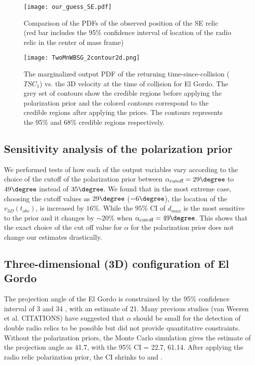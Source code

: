 \begin{figure}
	\texttt{[image: our\_guess\_SE.pdf]}
	\caption{Comparison of the PDFs of the observed position of the SE relic (red bar
	includes the 95\% confidence interval of location of the radio relic in
the center of mass frame)}
\end{figure}
\begin{figure}
	\texttt{[image: TwoMnWBSG\_2contour2d.png]}
	\caption{The marginalized output PDF of the returning time-since-collision
($TSC_1$) vs. the 3D velocity at the time of collision for El Gordo. The
grey set of contours show the credible regions before applying the
polarization prior and the colored contours correspond to the credible
regions after applying the priors. The contours represents the 95\% and
68\% credible regions respectively. }
	\label{fig:TSC_v3D}
\end{figure}

\subsection{Sensitivity analysis of the polarization prior}
%
\label{sec:sensitivityTests}
We performed tests of how each of the output variables vary according to the
choice of the cutoff of the polarization prior between
$\alpha_{\text{cutoff}} =
29 \degree$ to $49\degree$ instead of $35 \degree$.  
We found that in the most extreme case, choosing the cutoff values as $29
\degree$ ($-6 \degree$), the location of the $v_{3D}(t_{obs})$, is
increased by $ 16 \%$. While the $95\%$ CI of $d_{max}$ is
the most sensitive to the prior and it changes by
$\sim20 \%$ when $\alpha_{\text{cutoff}} = 49 \degree$. 
This shows that the exact choice of the cut off value for $\alpha$ for the
polarization prior does not change our estimates drastically.

\subsection{Three-dimensional (3D) configuration of El Gordo}
The projection angle of the El Gordo is constrained by the 95\% confidence
interval of 3 \degree and
34 \degree, with an estimate of 21\degree.  
Many previous studies (van Weeren et al. CITATIONS) have suggested that
$\alpha$ should be small for the detection of double radio relics to be
possible but did not provide quantitative constraints.    
Without the polarization priors, the Monte Carlo simulation gives the estimate
of the projection angle as 41.7\degree, with the 95\% CI = 22.7\degree, 61.14\degree.  
After applying the radio relic polarization prior, the CI shrinks to 
\degree and \degree.

